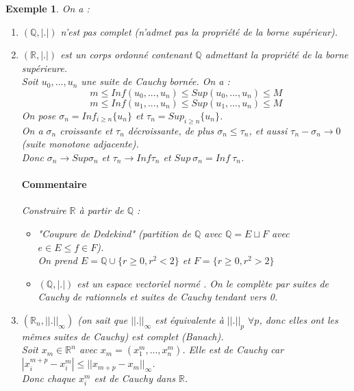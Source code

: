 \documentclass[a4paper, oneside]{report}
\theoremstyle{break}
\newtheorem{exem}[thm]{Exemple}
\newcommand{\R}{\mathbb{R}}
\newcommand{\Q}{\mathbb{Q}}
\newcommand{\evn}{espace vectoriel normé }
\begin{document}
\begin{exem}

On a :
\begin{enumerate}
\item $(\Q, |.|)$ n'est pas complet (n'admet pas la propriété de la borne supérieur).
\item $(\R, |.|)$ est un corps ordonné contenant $\Q$ admettant la propriété de la borne supérieure.\\
Soit $u_0,...,u_n$ une suite de Cauchy bornée. On a :
$$m\leq Inf(u_0,...,u_n)\leq Sup(u_0,...,u_n)\leq M$$
$$m\leq Inf(u_1,...,u_n)\leq Sup(u_1,...,u_n)\leq M$$
On pose $\sigma_n=Inf_{i\geq n}\{u_n\}$ et $\tau_n=Sup_{i\geq n}\{u_n\}$.\\
On a $\sigma_n$ croissante et $\tau_n$ décroissante, de plus $\sigma_n \leq \tau_n$, et aussi $\tau_n - \sigma_n \rightarrow 0$ (suite monotone adjacente).\\
Donc $\sigma_n \rightarrow Sup\sigma_n$ et $\tau_n \rightarrow Inf \tau_n$ et $Sup~\sigma_n = Inf~\tau_n$.

\paragraph{Commentaire}
Construire $\R$ à partir de $\Q$ :
\begin{itemize}
\item "Coupure de Dedekind" (partition de $\Q$ avec $\Q=E\sqcup F$ avec $e\in E \leq f\in F$).\\
On prend $E=\Q \cup \{r\geq 0, r^2<2 \}$ et $F=\{r\geq 0, r^2>2 \}$

\item $(\Q, |.|)$ est un \evn. On le complète par {suites de Cauchy de rationnels} et {suites de Cauchy tendant vers 0}.
\end{itemize}

\item $(\R_n, ||.||_\infty)$ (on sait que $||.||_\infty$ est équivalente à $||.||_p$ $\forall p$, donc elles ont les mêmes suites de Cauchy) est complet (Banach).\\
Soit $x_m \in \R^n$ avec $x_m=(x_1^m,...,x_n^m)$. Elle est de Cauchy car $|x_i^{m+p}-x_i^m| \leq ||x_{m+p}-x_m||_\infty$.\\
Donc chaque $x_i^m$ est de Cauchy dans $\R$.


\end{enumerate}
\end{exem}
\end{document}
